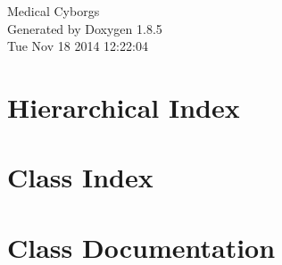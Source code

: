 \documentclass[twoside]{book}
\newcommand{\clearemptydoublepage}{%
  \newpage{\pagestyle{empty}\cleardoublepage}%
}
\begin{document}
\hypersetup{pageanchor=false}
\begin{titlepage}
\vspace*{7cm}
\begin{center}%
{\Large Medical Cyborgs }\\
\vspace*{1cm}
{\large Generated by Doxygen 1.8.5}\\
\vspace*{0.5cm}
{\small Tue Nov 18 2014 12:22:04}\\
\end{center}
\end{titlepage}
\clearemptydoublepage
\tableofcontents
\clearemptydoublepage
{}
\hypersetup{pageanchor=true}

\chapter{Hierarchical Index}

\chapter{Class Index}

\chapter{Class Documentation}
































\newpage
{}
{}
\printindex
\end{document}
